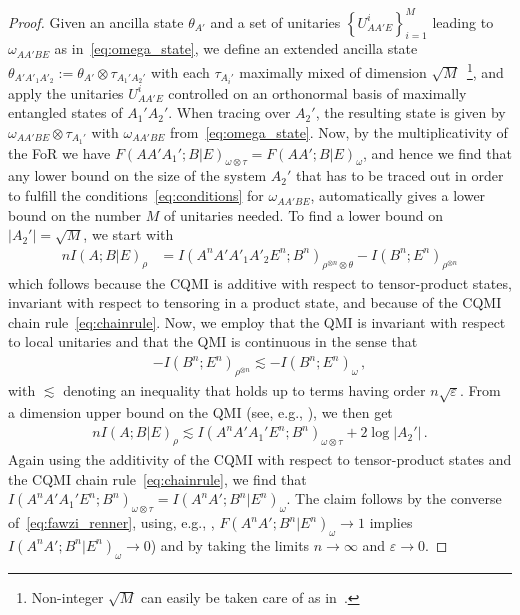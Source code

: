 \documentclass[a4paper,aps,prl,twocolumn,10pt,superscriptaddress]{revtex4-1}
\theoremstyle{plain}
\theoremstyle{definition}
\begin{document}
\begin{proof}
Given an ancilla state $\theta_{A'}$ and a set of unitaries $\left\{U^i_{AA'E}\right\}_{i=1}^M$ leading to $\omega_{AA'BE}$ as in~\eqref{eq:omega_state}, we define an extended ancilla state $\theta_{A'A'_1A'_2}:=\theta_{A'}\otimes\tau_{A_1'A_2'}$ with each $\tau_{A_i'}$ maximally mixed of dimension $\sqrt{M}$~\footnote{Non-integer $\sqrt{M}$ can easily be taken care of as in~\cite{BBMW_full16}.}, and apply the unitaries $U^i_{AA'E}$ controlled on an orthonormal basis of maximally entangled states of $A_1'A_2'$. When tracing over $A_2'$, the resulting state is given by $\omega_{AA'BE}\otimes\tau_{A_1'}$ with $\omega_{AA'BE}$ from~\eqref{eq:omega_state}. Now, by the multiplicativity of the FoR we have $F(AA'A_1';B|E)_{\omega\otimes\tau}=F(AA';B|E)_\omega$, and hence we find that any lower bound on the size of the system $A_2'$ that has to be traced out in order to fulfill the conditions~\eqref{eq:conditions} for $\omega_{AA'BE}$, automatically gives a lower bound on the number $M$ of unitaries needed. To find a lower bound on $\left|A_2'\right|=\sqrt{M}$, we start with
\begin{align*}
nI(A;B|E)_{\rho}&%
=I(A^{n}A'A'_1A'_2E^{n};B^{n})_{\rho^{\otimes n}\otimes\theta}-I(B^{n};E^{n})_{\rho^{\otimes n}}
\end{align*}
which follows because the CQMI is additive with respect to tensor-product states, invariant with respect to tensoring in a product state, and because of the CQMI chain rule~\eqref{eq:chainrule}. Now, we employ that the QMI is invariant with respect to local unitaries and that the QMI is continuous in the sense that
\begin{align*}
-I(B^{n};E^{n})_{\rho^{\otimes n}}\lesssim-I(B^{n};E^{n})_{\omega} \, ,
\end{align*}
with $\lesssim$ denoting an inequality that holds up to terms having order $n\sqrt{\varepsilon}$. From a dimension upper bound on the QMI (see, e.g., \cite{W16}), we then get
\begin{align*}
nI(A;B|E)_\rho\lesssim I(A^nA'A_1'E^{n};B^{n})_{\omega\otimes\tau}+2\log\left\vert A_2'\right\vert\,.
\end{align*}
Again using the additivity of the CQMI with respect to tensor-product states and the CQMI chain rule~\eqref{eq:chainrule}, we find that $I(A^nA'A_1'E^{n};B^{n})_{\omega\otimes\tau}=I(A^nA';B^{n}|E^{n})_{\omega}$. The claim follows by the converse of~\eqref{eq:fawzi_renner}, using, e.g., \cite[Prop.~35]{BSW14}, $F(A^nA';B^{n}|E^{n})_\omega\to1$ implies $I(A^nA';B^{n}|E^{n})_{\omega}\to0$) and by taking the limits $n\rightarrow\infty$ and $\varepsilon\to0$.
\end{proof}
\end{document}
